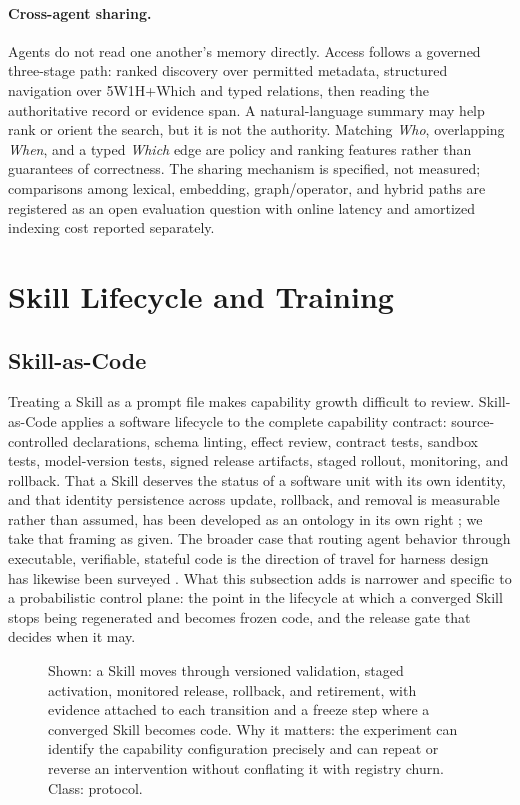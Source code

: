 \paragraph{Cross-agent sharing.}
Agents do not read one another's memory directly. Access follows a governed three-stage path: ranked discovery over permitted metadata, structured navigation over 5W1H+Which and typed relations, then reading the authoritative record or evidence span. A natural-language summary may help rank or orient the search, but it is not the authority. Matching \textit{Who}, overlapping \textit{When}, and a typed \textit{Which} edge are policy and ranking features rather than guarantees of correctness. The sharing mechanism is specified, not measured; comparisons among lexical, embedding, graph/operator, and hybrid paths are registered as an open evaluation question with online latency and amortized indexing cost reported separately.

\section{Skill Lifecycle and Training}
\label{sec:skill-lifecycle}

\subsection{Skill-as-Code}
\label{sec:skill-as-code}

Treating a Skill as a prompt file makes capability growth difficult to review. Skill-as-Code applies a software lifecycle to the complete capability contract: source-controlled declarations, schema linting, effect review, contract tests, sandbox tests, model-version tests, signed release artifacts, staged rollout, monitoring, and rollback. That a Skill deserves the status of a software unit with its own identity, and that identity persistence across update, rollback, and removal is measurable rather than assumed, has been developed as an ontology in its own right \cite{fan2026skillware}; we take that framing as given. The broader case that routing agent behavior through executable, verifiable, stateful code is the direction of travel for harness design has likewise been surveyed \cite{ning2026codeharness}. What this subsection adds is narrower and specific to a probabilistic control plane: the point in the lifecycle at which a converged Skill stops being regenerated and becomes frozen code, and the release gate that decides when it may.

\begin{figure}[t]
\centering
\caption{Shown: a Skill moves through versioned validation, staged activation, monitored release, rollback, and retirement, with evidence attached to each transition and a freeze step where a converged Skill becomes code. Why it matters: the experiment can identify the capability configuration precisely and can repeat or reverse an intervention without conflating it with registry churn. Class: protocol.}
\label{fig:skill-as-code}
\end{figure}

